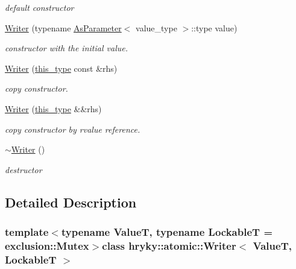 \begin{DoxyCompactItemize}
\begin{DoxyCompactList}\small\item\em default constructor \end{DoxyCompactList}\item 
\hyperlink{group__atomic__operation_gac68031a9e2acf0fd451ef9daa9e5efd2}{Writer} (typename \hyperlink{classhryky_1_1_as_parameter}{As\-Parameter}$<$ value\-\_\-type $>$\-::type value)
\begin{DoxyCompactList}\small\item\em constructor with the initial value. \end{DoxyCompactList}\item 
\hyperlink{group__atomic__operation_gac0872ceccd99b51c0f258fe05deca6c0}{Writer} (\hyperlink{classhryky_1_1atomic_1_1_writer_a6b1cad65fb3ef1a993a5eb9e91450aea}{this\-\_\-type} const \&rhs)
\begin{DoxyCompactList}\small\item\em copy constructor. \end{DoxyCompactList}\item 
\hypertarget{group__atomic__operation_ga2f399901b313d5e92f891e24d08f3079}{\hyperlink{group__atomic__operation_ga2f399901b313d5e92f891e24d08f3079}{Writer} (\hyperlink{classhryky_1_1atomic_1_1_writer_a6b1cad65fb3ef1a993a5eb9e91450aea}{this\-\_\-type} \&\&rhs)}\label{group__atomic__operation_ga2f399901b313d5e92f891e24d08f3079}

\begin{DoxyCompactList}\small\item\em copy constructor by rvalue reference. \end{DoxyCompactList}\item 
\hyperlink{group__atomic__operation_ga93eb8e0b170241286e90fec300b48d9a}{$\sim$\-Writer} ()
\begin{DoxyCompactList}\small\item\em destructor \end{DoxyCompactList}\end{DoxyCompactItemize}


\subsection{Detailed Description}
\subsubsection*{template$<$typename Value\-T, typename Lockable\-T = exclusion\-::\-Mutex$>$class hryky\-::atomic\-::\-Writer$<$ Value\-T, Lockable\-T $>$}

